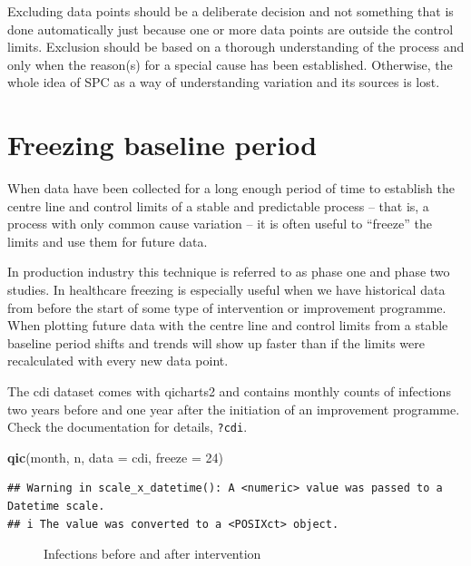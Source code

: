 \documentclass[
]{book}
\makeatletter
\newenvironment{Shaded}{\begin{snugshade}}{\end{snugshade}}
\newcommand{\AttributeTok}[1]{\textcolor[rgb]{0.13,0.29,0.53}{#1}}
\newcommand{\DecValTok}[1]{\textcolor[rgb]{0.00,0.00,0.81}{#1}}
\newcommand{\FunctionTok}[1]{\textcolor[rgb]{0.13,0.29,0.53}{\textbf{#1}}}
\newcommand{\NormalTok}[1]{#1}
\newcommand*\pandocbounded[1]{%
  \sbox\pandoc@box{#1}%
  \Gscale@div\@tempa{\textheight}{\dimexpr\ht\pandoc@box+\dp\pandoc@box\relax}%
  \Gscale@div\@tempb{\linewidth}{\wd\pandoc@box}%
  \ifdim\@tempb\p@<\@tempa\p@\let\@tempa\@tempb\fi%
  \ifdim\@tempa\p@<\p@\scalebox{\@tempa}{\usebox\pandoc@box}%
  \else\usebox{\pandoc@box}%
  \fi%
}
\makeatother
\begin{document}
Excluding data points should be a deliberate decision and not something that is done automatically just because one or more data points are outside the control limits. Exclusion should be based on a thorough understanding of the process and only when the reason(s) for a special cause has been established. Otherwise, the whole idea of SPC as a way of understanding variation and its sources is lost.

\section{Freezing baseline period}\label{freezing-baseline-period}

When data have been collected for a long enough period of time to establish the centre line and control limits of a stable and predictable process -- that is, a process with only common cause variation -- it is often useful to ``freeze'' the limits and use them for future data.

In production industry this technique is referred to as phase one and phase two studies. In healthcare freezing is especially useful when we have historical data from before the start of some type of intervention or improvement programme. When plotting future data with the centre line and control limits from a stable baseline period shifts and trends will show up faster than if the limits were recalculated with every new data point.

The cdi dataset comes with qicharts2 and contains monthly counts of infections two years before and one year after the initiation of an improvement programme. Check the documentation for details, \texttt{?cdi}.

\begin{Shaded}
\begin{Highlighting}[]
\FunctionTok{qic}\NormalTok{(month, n, }\AttributeTok{data =}\NormalTok{ cdi, }\AttributeTok{freeze =} \DecValTok{24}\NormalTok{)}
\end{Highlighting}
\end{Shaded}

\begin{verbatim}
## Warning in scale_x_datetime(): A <numeric> value was passed to a Datetime scale.
## i The value was converted to a <POSIXct> object.
\end{verbatim}

\begin{figure}
\centering
\pandocbounded{}
\caption{\label{fig:qicharts-cdi1}Infections before and after intervention}
\end{figure}
\end{document}
